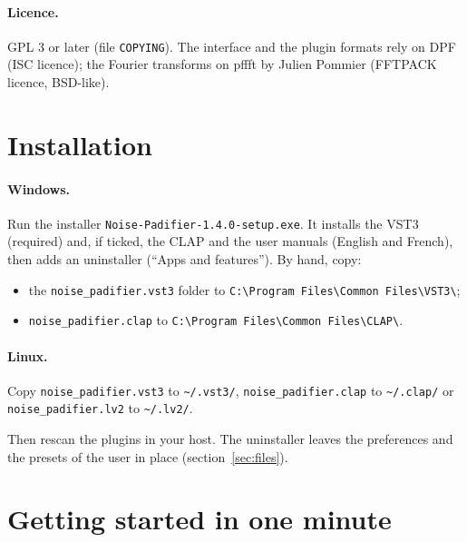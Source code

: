 \documentclass[a4paper,11pt]{article}
\begin{document}
\paragraph{Licence.} GPL 3 or later (file \texttt{COPYING}). The interface and the plugin formats
rely on DPF (ISC licence); the Fourier transforms on pffft by Julien Pommier (FFTPACK licence,
BSD-like).

\section{Installation}

\paragraph{Windows.} Run the installer \texttt{Noise-Padifier-1.4.0-setup.exe}. It installs the
VST3 (required) and, if ticked, the CLAP and the user manuals (English and French), then adds an
uninstaller (``Apps and features''). By hand, copy:
\begin{itemize}
\item the \texttt{noise\_padifier.vst3} folder to \verb|C:\Program Files\Common Files\VST3\|;
\item \texttt{noise\_padifier.clap} to \verb|C:\Program Files\Common Files\CLAP\|.
\end{itemize}

\paragraph{Linux.} Copy \texttt{noise\_padifier.vst3} to \verb|~/.vst3/|,
\texttt{noise\_padifier.clap} to \verb|~/.clap/| or \texttt{noise\_padifier.lv2} to
\verb|~/.lv2/|.

Then rescan the plugins in your host. The uninstaller leaves the preferences and the presets of
the user in place (section~\ref{sec:files}).

\section{Getting started in one minute}
\end{document}
